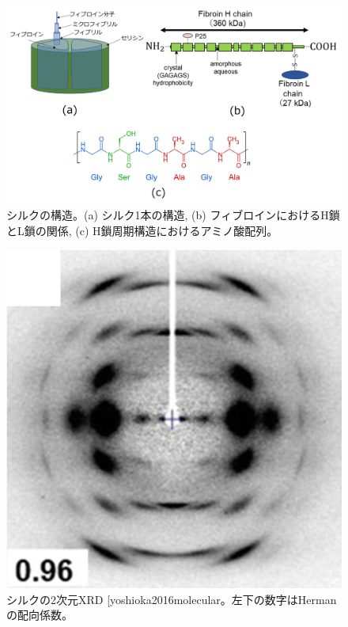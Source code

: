 \documentclass[dvipdfmx,12pt,a4paper]{jreport}
\makeatletter
\DeclareRobustCommand\cite{\unskip
    	\@ifnextchar[{\@tempswatrue\@citex}{\@tempswafalse\@citex[]}}
\makeatother
\begin{document}
		\begin{figure}[h]
			\centering
			\includegraphics[width=\linewidth]{fibroin_structure.jpg}
			\caption{シルクの構造。(a) シルク1本の構造, (b) フィブロインにおけるH鎖とL鎖の関係, 
			(c) H鎖周期構造におけるアミノ酸配列。}
			\label{fibroin}
		\end{figure}
		\begin{figure}[H]
			\centering
			\includegraphics[scale=0.8]{silk_fiber_デバイ.jpg}
			\caption{シルクの2次元XRD\cite{yoshioka2016molecular}。左下の数字はHermanの配向係数。}
			\label{silk_fiber_debai}
		\end{figure}
\end{document}
